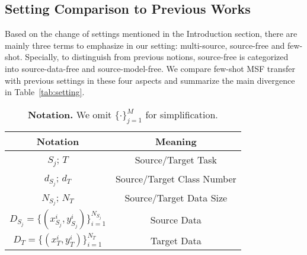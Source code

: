 \documentclass[letterpaper]{article} %
\begin{document}
\subsection{Setting Comparison to Previous Works}

Based on the change of settings mentioned in the Introduction section, there are mainly three terms to emphasize in our setting: multi-source, source-free and few-shot. Specially, to distinguish from previous notions, source-free is categorized into source-data-free and source-model-free. We compare few-shot MSF transfer with previous settings in these four aspects and summarize the main divergence in Table~\ref{tab:setting}.


 \begin{table}[!ht]
     \renewcommand{\arraystretch}{1.2}
    \centering
    \begin{tabular}{c |c }
        \toprule
        \textbf{Notation} & \textbf{Meaning}\\
        \midrule
        $S_j$; $T$ & Source/Target Task\\
        $d_{S_j}$; $d_T$& Source/Target Class Number\\
     $N_{S_j}$; $N_T$ & Source/Target Data Size \\
         $D_{S_j} = \{(x_{S_j}^i, y_{S_j}^i)\}_{i = 1}^{N_{S_j}}$ & Source Data \\
         $D_T = \{(x_T^i, y_T^i)\}_{i = 1}^{N_T}$ & Target Data \\
          \bottomrule
    \end{tabular}
    \caption{\textbf{Notation.} We omit $\{\cdot\}_{j=1}^M$ for simplification.}
    \label{tab:notation}
\end{table}
\end{document}
